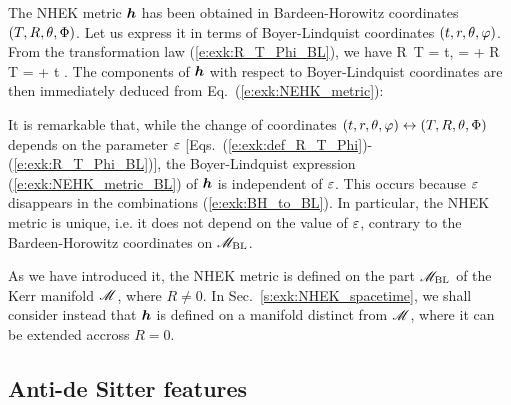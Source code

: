 The NHEK metric $\bm{h}$ has been obtained in Bardeen-Horowitz coordinates
$(T,R,\theta,\Phi)$. Let us express it in terms of Boyer-Lindquist coordinates
$(t,r,\theta,\varphi)$. From the transformation law (\ref{e:exk:R_T_Phi_BL}), we have
\be \label{e:exk:BH_to_BL}
    R \,\dd T =  \dd t,\qquad
     =  \qand
    \dd\Phi + R \, \dd T = \dd\ph +  \dd t .
\ee
The components of $\bm{h}$ with respect to Boyer-Lindquist coordinates are then
immediately deduced from Eq.~(\ref{e:exk:NEHK_metric}):
\be \label{e:exk:NEHK_metric_BL}
\ee
\begin{remark}
It is remarkable that, while
the change of coordinates $(t,r,\theta,\varphi)\leftrightarrow (T,R,\theta,\Phi)$ depends on the
parameter $\varepsilon$ [Eqs.~(\ref{e:exk:def_R_T_Phi})-(\ref{e:exk:R_T_Phi_BL})],
the Boyer-Lindquist expression (\ref{e:exk:NEHK_metric_BL}) of $\bm{h}$ is
independent of $\varepsilon$. This occurs because $\varepsilon$ disappears in
the combinations (\ref{e:exk:BH_to_BL}).
In particular, the NHEK metric is unique, i.e. it does not depend on the value
of $\varepsilon$, contrary to the Bardeen-Horowitz coordinates on
$\mathscr{M}_{\rm BL}$.
\end{remark}

\begin{remark}
As we have introduced it, the NHEK metric is defined on the part $\mathscr{M}_{\rm BL}$
of the Kerr manifold $\mathscr{M}$, where $R\neq 0$.
In Sec.~\ref{s:exk:NHEK_spacetime},
we shall consider instead that $\bm{h}$ is defined
on a manifold distinct from $\mathscr{M}$, where it can be extended accross $R=0$.
\end{remark}

\subsection{Anti-de Sitter features}

